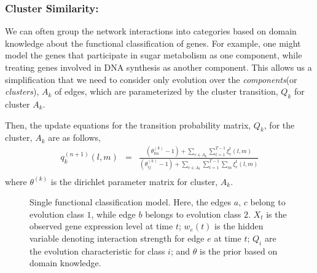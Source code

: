 \documentclass{bioinfo}
\begin{document}
\begin{methods}
\subsubsection{Cluster Similarity: } 
We can often group the network interactions into categories  based on
domain knowledge about the functional classification of genes.  For
example, one might model the genes that participate in sugar
metabolism as one 
component, while treating genes involved in DNA synthesis as another
component.  This allows us a
simplification that we need to  consider only evolution over the
\emph{components}(or \emph{clusters}), $A_k$ of edges,  which are parameterized by the
cluster transition, $Q_{k}$ for  cluster $A_k$. 

Then, the update equations for the transition probability matrix,
$Q_k$, for the cluster, $A_k$ are as follows,
\begin{eqnarray}
  \label{eq:cluster_update}
  q_{k}^{(n+1)}(l, m)   &=& \frac{(\theta^{(k)}_{lm} -1) + \sum_{e \in A_k} \sum_{t=1}^{T-1} \xi^{t}_{e}(l,m)}{ (\theta^{(k)}_{ij} -1) + \sum_{e \in A_k} \sum_{t=1}^{T-1}
   \sum_{m} \xi^{t}_{e}(l,m)} \nonumber \\
\end{eqnarray}
where $\theta^{(k)}$ is the dirichlet parameter matrix for cluster,
$A_{k}$.
\begin{figure}[h]
  \centering
  \caption{Single functional classification model. Here, the
    edges $a, \,c$ belong to evolution class $1$, while edge $b$
    belongs to evolution class $2$. $X_{t}$ is the observed gene
    expression level at time $t$; $w_{e}(t)$ is the hidden variable
    denoting interaction strength for edge $e$ at time $t$; $Q_{i}$
    are the evolution characteristic for class $i$; and $\theta$ is
    the prior based on domain knowledge.}
  \label{fig:factorial}
\end{figure}



\end{methods}
\end{document}
